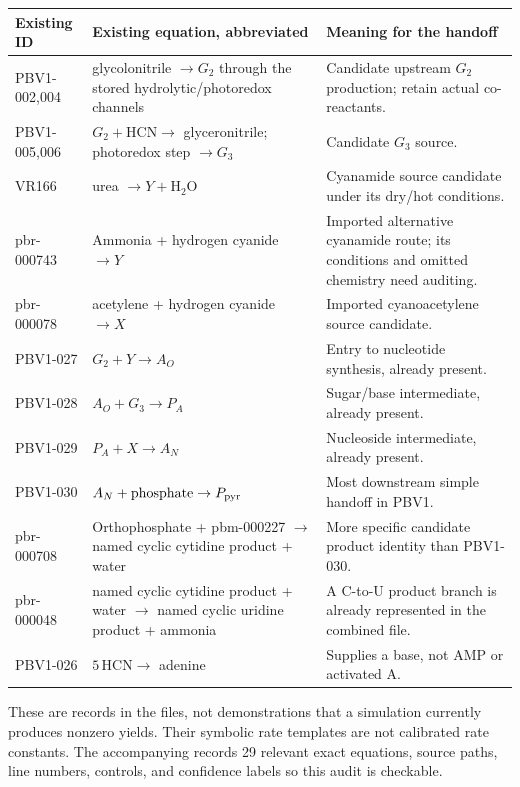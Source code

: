 \documentclass[11pt]{article}
\begin{document}
\begin{longtable}{p{}p{}p{}}
\toprule
Existing ID & Existing equation, abbreviated & Meaning for the handoff \\
\midrule
PBV1-002,004 & glycolonitrile $\to G_2$ through the stored hydrolytic/photoredox
channels & Candidate upstream $G_2$ production; retain actual co-reactants. \\
PBV1-005,006 & $G_2+\mathrm{HCN}\to$ glyceronitrile; photoredox step $\to G_3$
& Candidate $G_3$ source. \\
VR166 & urea $\to Y+\mathrm{H_2O}$ & Cyanamide source candidate under its dry/hot conditions. \\
pbr-000743 & Ammonia + hydrogen cyanide $\to Y$ & Imported alternative cyanamide route;
its conditions and omitted chemistry need auditing. \\
pbr-000078 & acetylene + hydrogen cyanide $\to X$ & Imported cyanoacetylene source candidate. \\
PBV1-027 & $G_2+Y\to A_O$ & Entry to nucleotide synthesis, already present. \\
PBV1-028 & $A_O+G_3\to P_A$ & Sugar/base intermediate, already present. \\
PBV1-029 & $P_A+X\to A_N$ & Nucleoside intermediate, already present. \\
PBV1-030 & $A_N+\mathrm{phosphate}\to P_{\rm pyr}$ & Most downstream simple handoff in PBV1. \\
pbr-000708 & Orthophosphate + pbm-000227 $\to$ named cyclic cytidine product + water
& More specific candidate product identity than PBV1-030. \\
pbr-000048 & named cyclic cytidine product + water $\to$ named cyclic uridine product
+ ammonia & A C-to-U product branch is already represented in the combined file. \\
PBV1-026 & $5\,\mathrm{HCN}\to$ adenine & Supplies a base, not AMP or activated A. \\
\bottomrule
\end{longtable}
These are records in the files, not demonstrations that a simulation currently
produces nonzero yields. Their symbolic rate templates are not calibrated rate
constants. The accompanying  records
29 relevant exact equations, source paths, line numbers, controls, and confidence
labels so this audit is checkable.
\end{document}

